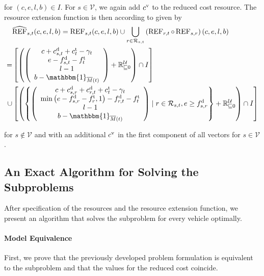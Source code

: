 for $(c,e,l,b)\in I$. For $s\in\mathcal{V}$, we again add $c^{\operatorname{v}}$ to the reduced cost resource. The resource extension function is then according to  given by
\begin{align*}
	& \widehat{\REF}_{s,t}(c,e,l,b) = \REF_{s,t}(c,e,l,b)\cup\bigcup_{r\in\Rst}\left(\REF_{r,t}\circ\REF_{s,r}\right)(c,e,l,b) \\
	= & \left[\left(\left(\begin{array}{c}
		c + \cd_{s,t} + \ct_t - \gamma_t \\ e - \fd_{s,t} - \ft_t \\ l - 1 \\ b - \mathbbm{1}_{\overline{M}(t)}
	\end{array} \right) + \mathbb{R}^{\mathcal{U}}_{\sqsubseteq 0}\right)\cap I\right] \\
	\cup & \left[\left(\left\{\left(\begin{array}{c}
		c + \cd_{s,r} + \cd_{r,t} + \ct_t - \gamma_t \\ \min\left(e-\fd_{s,r}-\ft_r,1\right) - \fd_{r,t} - \ft_t \\ l - 1 \\ b - \mathbbm{1}_{\overline{M}(t)}
	\end{array}\right) \mid r\in\Rst, e\geq\fd_{s,r}\right\} + \mathbb{R}^{\mathcal{U}}_{\sqsubseteq 0}\right)\cap I\right]
\end{align*}

for $s\notin\mathcal{V}$ and with an additional $c^{\operatorname{v}}$ in the first component of all vectors for $s\in\mathcal{V}$.


\subsection{An Exact Algorithm for Solving the Subproblems}

After specification of the resources and the resource extension function, we present an algorithm that solves the subproblem for every vehicle optimally.

\paragraph{Model Equivalence} \parfill

First, we prove that the previously developed problem formulation is equivalent to the subproblem and that the values for the reduced cost coincide.

